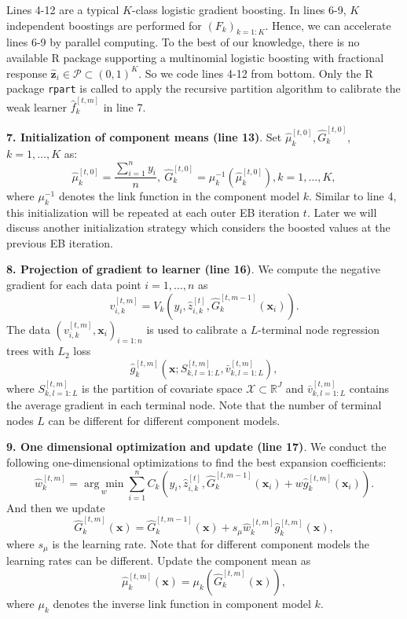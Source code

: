 \documentclass[11pt]{article}
\numberwithin{equation}{section}
\def\R{{\mathbb R}}  %
\def\bx{\boldsymbol{x}}
\def\bz{\boldsymbol{z}}
\begin{document}
Lines 4-12 are a typical $K$-class logistic gradient boosting. 
In lines 6-9, $K$ independent boostings are performed for $(F_k)_{k=1:K}$. Hence, we can accelerate lines 6-9 by parallel computing.
To the best of our knowledge, there is no available R package supporting a multinomial logistic boosting with fractional response $\hat{\bz}_{i}\in\mathcal{P}\subset(0,1)^K$.
So we code lines 4-12 from bottom. Only the R package {\tt rpart} is called to apply the recursive partition algorithm to calibrate the weak learner $\hat{f}_k^{[t,m]}$ in line 7.

{\bf 7. Initialization of component means (line 13)}. Set $\hat{\mu}_k^{[t,0]},\hat{G}_k^{[t,0]}$, $k=1,\ldots,K$ as:
			\begin{equation}\label{ini-2}
				\hat{\mu}_k^{[t,0]}=\frac{\sum_{i=1}^ny_i}{n},~ \hat{G}_k^{[t,0]}=\mu_k^{-1}(\hat{\mu}_k^{[t,0]}), k=1,\ldots,K,
					\end{equation}
		where $\mu^{-1}_k$ denotes the link function in the component model $k$. 
		Similar to line 4, this initialization will be repeated at each outer EB iteration $t$. Later we will discuss another initialization strategy which considers the boosted values at the previous EB iteration.
	
{\bf 8. Projection of gradient to learner (line 16)}.
		We compute the negative gradient for each data point $i=1,\ldots,n$ as 
		$$v_{i,k}^{[t,m]}=V_k(y_i,\hat{z}^{[t]}_{i,k},\hat{G}_k^{[t,m-1]}(\bx_i)).$$
		The data $(v_{i,k}^{[t,m]},\bx_i)_{i=1:n}$ is used to calibrate a $L$-terminal node regression trees with $L_2$ loss $$\hat{g}_k^{[t,m]}\left(\bx;S^{[t,m]}_{k,l=1:L},\bar{v}^{[t,m]}_{k,l=1:L}\right),$$
		 where $S^{[t,m]}_{k,l=1:L}$ is the partition of covariate space $\mathcal{X}\subset\R^J$ and $\bar{v}^{[t,m]}_{k,l=1:L}$ contains the average gradient in each terminal node.
		 Note that the number of terminal nodes $L$ can be different for different component models. 
		
{\bf 9. One dimensional optimization and update (line 17)}.	
	We conduct the following one-dimensional optimizations to find the best expansion coefficients:
		$$\hat{w}_{k}^{[t,m]}=\underset{w}{\arg\min}\sum_{i=1}^n C_{k}(y_i,\hat{z}_{i,k}^{[t]},\hat{G}_k^{[t,m-1]}(\bx_i)+w\hat{g}_k^{[t,m]}(\bx_i)).$$
		And then we update
		$$\hat{G}_k^{[t,m]}(\bx)=\hat{G}_k^{[t,m-1]}(\bx)+s_\mu\hat{w}_{k}^{[t,m]}\hat{g}_{k}^{[t,m]}(\bx),$$
		where $s_\mu$ is the learning rate. Note that for different component models the learning rates can be different. 
	Update the component mean as
$$\hat{\mu}_k^{[t,m]}(\bx)=\mu_k(\hat{G}_k^{[t,m]}(\bx)),$$
where $\mu_k$ denotes the inverse link function in component model $k$.
	
\end{document}

